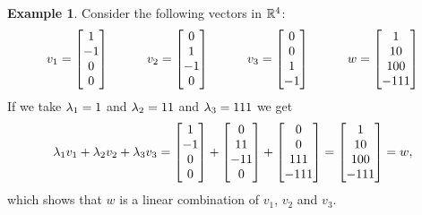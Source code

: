 \documentclass[reqno]{amsart}
\theoremstyle{definition}
\newtheorem{example}[theorem]{Example}
\begin{document}
\begin{example}\label{eg-lincomb-i}
 Consider the following vectors in ${\mathbb{R}}^4$:
 \[ v_1 = \left[\begin{matrix} 1 \\ -1 \\ 0 \\ 0 \end{matrix}\right] \hspace{3em}
    v_2 = \left[\begin{matrix} 0 \\ 1 \\ -1 \\ 0 \end{matrix}\right] \hspace{3em}
    v_3 = \left[\begin{matrix} 0 \\ 0 \\ 1 \\ -1 \end{matrix}\right] \hspace{3em}
    w   = \left[\begin{matrix} 1 \\ 10 \\ 100 \\ -111 \end{matrix}\right]
 \]
 If we take $\lambda_1=1$ and $\lambda_2=11$ and $\lambda_3=111$ we get
 \[ \lambda_1 v_1 + \lambda_2 v_2 + \lambda_3 v_3 =
     \left[\begin{matrix} 1 \\ -1 \\ 0 \\ 0 \end{matrix}\right] +
     \left[\begin{matrix} 0 \\ 11 \\ -11 \\ 0 \end{matrix}\right] +
     \left[\begin{matrix} 0 \\ 0 \\ 111 \\ -111 \end{matrix}\right] =
     \left[\begin{matrix} 1 \\ 10 \\ 100 \\ -111 \end{matrix}\right] = w,
 \]
 which shows that $w$ is a linear combination of $v_1$, $v_2$ and
 $v_3$.
\end{example}
\end{document}
